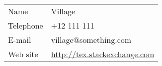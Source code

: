 \documentclass[border=5pt]{standalone}
\makeatletter
\newcommand{\UserInfo}[4]{%
		\par\noindent%
		\begin{tabular}{l@{\thinspace:\thinspace}l}%
			Name      & #1\\%
			Telephone & #2\\%
			E-mail    & #3\\%
			Web site  & \url{#4}%
		\end{tabular}%
		\ignorespaces\par%
	}
\makeatother
\begin{document}
\UserInfo{Village}{+12 111 111}{village@something.com}{http://tex.stackexchange.com}
\end{document}
